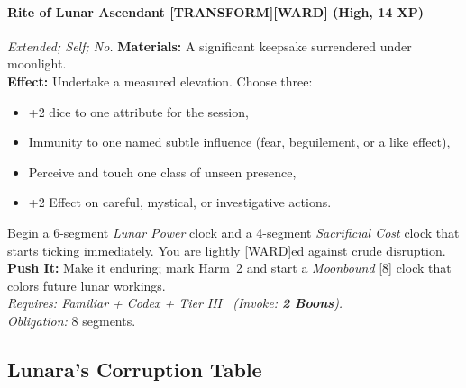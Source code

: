 \paragraph{Rite of Lunar Ascendant \textnormal{[TRANSFORM][WARD]} (High, 14 XP)} \emph{Extended; Self; No.}
\textbf{Materials:} A significant keepsake surrendered under moonlight.\\
\textbf{Effect:} Undertake a measured elevation. Choose three:
\begin{itemize}
  \item +2 dice to one attribute for the session,
  \item Immunity to one named subtle influence (fear, beguilement, or a like effect),
  \item Perceive and touch one class of unseen presence,
  \item +2 Effect on careful, mystical, or investigative actions.
\end{itemize}
Begin a 6-segment \emph{Lunar Power} clock and a 4-segment \emph{Sacrificial Cost} clock that starts ticking immediately. You are lightly [WARD]ed against crude disruption.\\
\textbf{Push It:} Make it enduring; mark Harm~2 and start a \emph{Moonbound} [8] clock that colors future lunar workings.\\
\emph{Requires: Familiar + Codex + Tier III \ (\textit{Invoke:} \textbf{2 Boons}).}\\
\emph{Obligation:} 8 segments.

\subsection*{Lunara's Corruption Table}
\label{sec:lunara-corruption}

